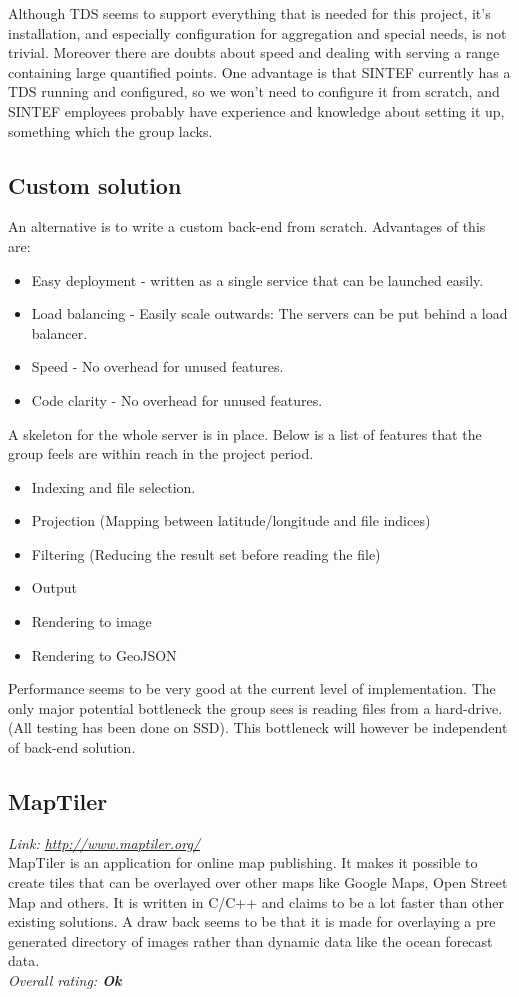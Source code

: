 \documentclass[11pt,a4paper,titlepage,oneside]{report}
\begin{document}
  Although \gls{TDS} seems to support everything that is needed for this project, it's installation, and especially configuration for aggregation and special needs, is not trivial. Moreover there are doubts about speed and dealing with serving a range containing large quantified points. One advantage is that SINTEF currently has a \gls{TDS} running and configured, so we won't need to configure it from scratch, and SINTEF employees probably have experience and knowledge about setting it up, something which the group lacks.

  \subsection{Custom solution}
  An alternative is to write a custom \gls{back-end} from scratch.
  Advantages of this are:
  \begin{itemize}
  \item Easy deployment - written as a single service that can be launched easily.
  \item Load balancing - Easily scale outwards: The servers can be put behind a load balancer. 
  \item Speed - No overhead for unused features.
  \item Code clarity - No overhead for unused features.
  \end{itemize}
  A skeleton for the whole server is in place. Below is a list of features that the group feels are within reach in the project period. 
  \begin{itemize}
  \item Indexing and file selection.
  \item Projection (Mapping between latitude/longitude and file indices)
  \item Filtering (Reducing the result set before reading the file)
  \item Output
  \item Rendering to image
  \item Rendering to GeoJSON
  \end{itemize}

  Performance seems to be very good at the current level of implementation. The only major potential bottleneck the group sees is reading files from a hard-drive. (All testing has been done on \gls{SSD}). This bottleneck will however be independent of \gls{back-end} solution.
  
  \subsection{MapTiler}
  \emph{Link: \url{http://www.maptiler.org/}} \\%
    MapTiler is an application for online map publishing. It makes it possible to create tiles that can be overlayed over other maps like Google Maps, Open Street Map and others. It is written in C/C++ and claims to be a lot faster than other existing solutions. A draw back seems to be that it is made for overlaying a pre generated directory of images rather than dynamic data like the ocean forecast data.
  \\ \emph{Overall rating: \textbf{Ok}}
  
\end{document}
